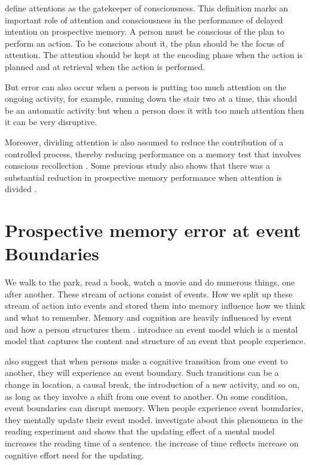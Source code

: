\cite{Reason1984} define attentions as the gatekeeper of consciousness. This definition marks an important role of attention and consciousness in the performance of delayed intention on prospective memory. A person must be conscious of the plan to perform an action. To be conscious about it, the plan should be the focus of attention. The attention should be kept at the encoding phase when the action is planned and at retrieval when the action is performed.

But error can also occur when a person is putting too much attention on the ongoing activity, for example, running down the stair two at a time, this should be an automatic activity but when a person does it with too much attention then it can be very disruptive.

Moreover, dividing attention is also assumed to reduce the contribution of a controlled process, thereby
reducing performance on a memory test that involves conscious recollection \citep{Jacoby1989}.
Some previous study also shows that there was a substantial reduction in prospective memory performance when attention is divided \citep{McDaniel1998}
\citep{10.1371/journal.pone.0074447}.


\section{Prospective memory error at event Boundaries}

We walk to the park, read a book, watch a movie and do numerous things, one after another. These stream of actions consist of events. How we split up these stream of action into events and stored them into memory influence how we think and what to remember. Memory and cognition are heavily influenced by event and how a person structures them \citep{Radvansky2012}. \cite{Radvansky2011} introduce an event model which is a mental model that captures the content and structure of an event that people experience.

\cite{Radvansky2012} also suggest that when persons make a cognitive transition from one event to another, they will experience an event boundary. Such transitions can be a change in location, a causal break, the introduction of a new activity, and so on, as long as they involve a shift from one event to another.  On some condition, event boundaries can disrupt memory. When people experience event boundaries, they mentally update their event model. \cite{Radvansky2010} investigate about this phenomena in the reading experiment and shows that the updating effect of a mental model increases the reading time of a sentence. the increase of time reflects increase on cognitive effort need for the updating.


